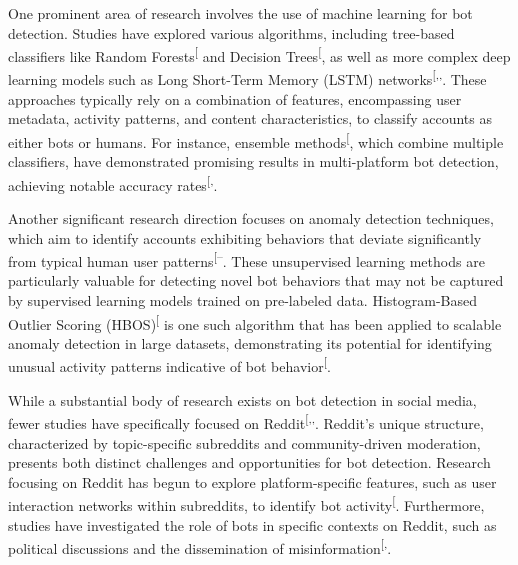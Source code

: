 \documentclass[
  12pt,
  letterpaper,
  DIV=11,
  numbers=noendperiod,
  abstract]{scrartcl}
\begin{document}
One prominent area of research involves the use of machine learning for
bot detection. Studies have explored various algorithms, including
tree-based classifiers like Random
Forests\textsuperscript{{[}\citeproc{ref-breiman2001random}{5}{]}} and
Decision
Trees\textsuperscript{{[}\citeproc{ref-breiman1984classification}{6}{]}},
as well as more complex deep learning models such as Long Short-Term
Memory (LSTM)
networks\textsuperscript{{[},,\citeproc{ref-hochreiter1997long}{8}{]}}.
These approaches typically rely on a combination of features,
encompassing user metadata, activity patterns, and content
characteristics, to classify accounts as either bots or humans. For
instance, ensemble
methods\textsuperscript{{[}\citeproc{ref-dietterich2000ensemble}{9}{]}},
which combine multiple classifiers, have demonstrated promising results
in multi-platform bot detection, achieving notable accuracy
rates\textsuperscript{{[},\citeproc{ref-multibotdetector}{4}{]}}.

Another significant research direction focuses on anomaly detection
techniques, which aim to identify accounts exhibiting behaviors that
deviate significantly from typical human user
patterns\textsuperscript{{[}--\citeproc{ref-chandola2009anomaly}{12}{]}}.
These unsupervised learning methods are particularly valuable for
detecting novel bot behaviors that may not be captured by supervised
learning models trained on pre-labeled data. Histogram-Based Outlier
Scoring
(HBOS)\textsuperscript{{[}\citeproc{ref-goldstein2012histogram}{13}{]}}
is one such algorithm that has been applied to scalable anomaly
detection in large datasets, demonstrating its potential for identifying
unusual activity patterns indicative of bot
behavior\textsuperscript{{[}\citeproc{ref-anomalycloudflare}{10}{]}}.

While a substantial body of research exists on bot detection in social
media, fewer studies have specifically focused on
Reddit\textsuperscript{{[},,\citeproc{ref-mlredditbots}{15}{]}}.
Reddit's unique structure, characterized by topic-specific subreddits
and community-driven moderation, presents both distinct challenges and
opportunities for bot detection. Research focusing on Reddit has begun
to explore platform-specific features, such as user interaction networks
within subreddits, to identify bot
activity\textsuperscript{{[}\citeproc{ref-redditbotnetwork}{14}{]}}.
Furthermore, studies have investigated the role of bots in specific
contexts on Reddit, such as political discussions and the dissemination
of
misinformation\textsuperscript{{[},\citeproc{ref-multibotdetector}{4}{]}}.
\end{document}
